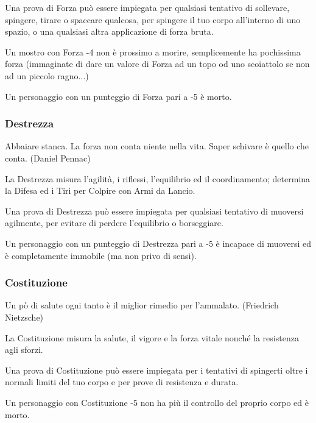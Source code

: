 \begin{multicols}{2}
Una prova di Forza può essere impiegata per qualsiasi tentativo di sollevare, spingere, tirare o spaccare qualcosa, per spingere il tuo corpo all'interno di uno spazio, o una qualsiasi altra applicazione di forza bruta.

Un mostro con Forza -4 non è prossimo a morire, semplicemente ha pochissima forza (immaginate di dare un valore di Forza ad un topo od uno scoiattolo se non ad un piccolo ragno...)

Un personaggio con un punteggio di Forza pari a -5 è morto.

\subsubsection{Destrezza}\label{destrezza}

\begin{enfasi}{
Abbaiare stanca. La forza non conta niente nella vita. Saper schivare è quello che conta. (Daniel Pennac)
}\end{enfasi}

La Destrezza misura l'agilità, i riflessi, l'equilibrio ed il coordinamento; determina la Difesa ed i Tiri per Colpire con Armi da Lancio.

Una prova di Destrezza può essere impiegata per qualsiasi tentativo di muoversi agilmente, per evitare di perdere l'equilibrio o borseggiare.

Un personaggio con un punteggio di Destrezza pari a -5 è incapace di muoversi ed è completamente immobile (ma non privo di sensi).

\subsubsection{Costituzione}\label{costituzione}

\begin{enfasi}{
Un pò di salute ogni tanto è il miglior rimedio per l'ammalato. (Friedrich Nietzsche)
}\end{enfasi}

La Costituzione misura la salute, il vigore e la forza vitale nonché la resistenza agli sforzi.

Una prova di Costituzione può essere impiegata per i tentativi di spingerti oltre i normali limiti del tuo corpo e per prove di resistenza e durata.

Un personaggio con Costituzione -5 non ha più il controllo del proprio corpo ed è morto.


\end{multicols}
